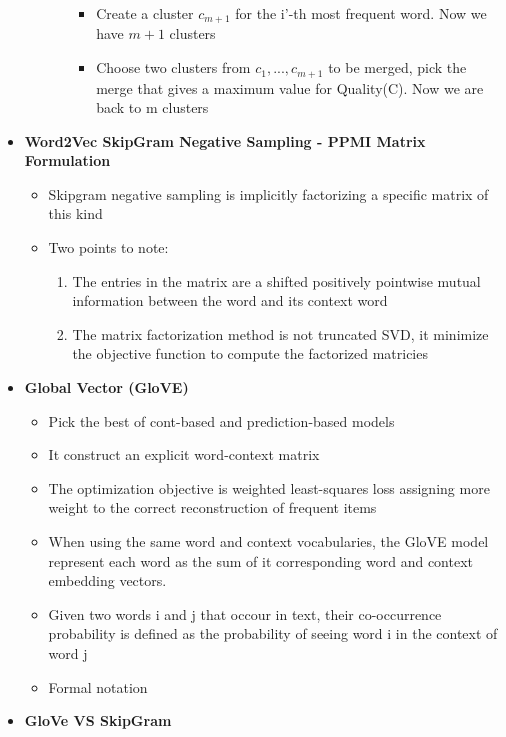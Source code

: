 \begin{itemize}
\begin{itemize}
\begin{itemize}
\begin{itemize}
                \item Create a cluster \(c_{m+1}\) for the i'-th most frequent word. Now we have \(m + 1\) clusters
                \item Choose two clusters from \(c_1, ..., c_{m + 1}\) to be merged, pick the merge that gives a maximum value for Quality(C). Now we are back to m clusters
            \end{itemize}
        \end{itemize}
    \end{itemize}
    \item \textbf{Word2Vec SkipGram Negative Sampling - PPMI Matrix Formulation}
    \begin{itemize}
        \item Skipgram negative sampling is implicitly factorizing a specific matrix of this kind
        \item Two points to note:
        \begin{enumerate}
            \item The entries in the matrix are a shifted positively pointwise mutual information between the word and its context word
            \item The matrix factorization method is not truncated SVD, it minimize the objective function to compute the factorized matricies
        \end{enumerate}
    \end{itemize}
    \item \textbf{Global Vector (GloVE)}
    \begin{itemize}
        \item Pick the best of cont-based and prediction-based models
        \item It construct an explicit word-context matrix
        \item The optimization objective is weighted least-squares loss assigning more weight to the correct reconstruction of frequent items
        \item When using the same word and context vocabularies, the GloVE model represent each word as the sum of it corresponding word and context embedding vectors.
        \item Given two words i and j that occour in text, their co-occurrence probability is defined as the probability of seeing word i in the context of word j
        \item Formal notation
    \end{itemize}
    \item \textbf{GloVe VS SkipGram}

\end{itemize}
